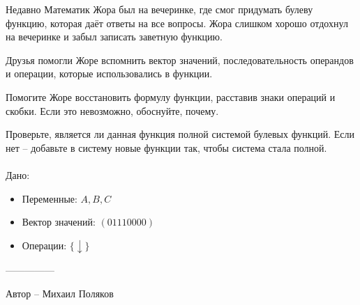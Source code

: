\question
Недавно Математик Жора был на вечеринке, где смог придумать булеву функцию, которая даёт ответы на все вопросы. Жора слишком хорошо отдохнул на вечеринке и забыл записать заветную функцию.

Друзья помогли Жоре вспомнить вектор значений, последовательность операндов и операции, которые использовались в функции.

Помогите Жоре восстановить формулу функции, расставив знаки операций и скобки. Если это невозможно, обоснуйте, почему.

Проверьте, является ли данная функция полной системой булевых функций. Если нет -- добавьте в систему новые функции так, чтобы система стала полной.
\\
\\
Дано:
\begin{itemize}
\item Переменные: $A, B, C$
\item Вектор значений: $(01110000)$
\item Операции: $\{\downarrow\}$
\end{itemize}

---------------

Автор -- Михаил Поляков